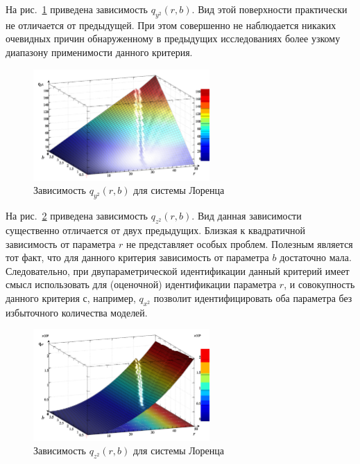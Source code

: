 На рис.~\ref{atu:f:lor_qy2_r_b} приведена зависимость
$q_{y^2}(r,b)$. Вид этой поверхности практически не отличается от предыдущей.
При этом совершенно не наблюдается никаких очевидных причин обнаруженному
в предыдущих исследованиях
более узкому диапазону применимости данного критерия.

\begin{figure}[h!]
  \centerline{  \includegraphics[width=0.60\textwidth]{p/cha/lor/q2d/lor_qy2_r_b.png}  }
  \caption{Зависимость $q_{y^2}(r,b)$ для системы Лоренца}
  \label{atu:f:lor_qy2_r_b}
\end{figure}

На рис.~\ref{atu:f:lor_qz2_r_b} приведена зависимость
$q_{z^2}(r,b)$.
Вид данная зависимости существенно отличается от двух предыдущих.
Близкая к квадратичной зависимость от параметра $r$
не представляет особых проблем. Полезным является тот факт,
что для данного критерия зависимость от параметра $b$
достаточно мала. Следовательно, при двупараметрической идентификации
данный критерий имеет смысл  использовать для (оценочной)
идентификации параметра $r$, и совокупность данного критерия
с, например, $q_{x^2}$ позволит идентифицировать
оба параметра без избыточного количества моделей.

\begin{figure}[h!]
  \centerline{  \includegraphics[width=0.60\textwidth]{p/cha/lor/q2d/lor_qz2_r_b.png}  }
  \caption{Зависимость $q_{z^2}(r,b)$ для системы Лоренца}
  \label{atu:f:lor_qz2_r_b}
\end{figure}

